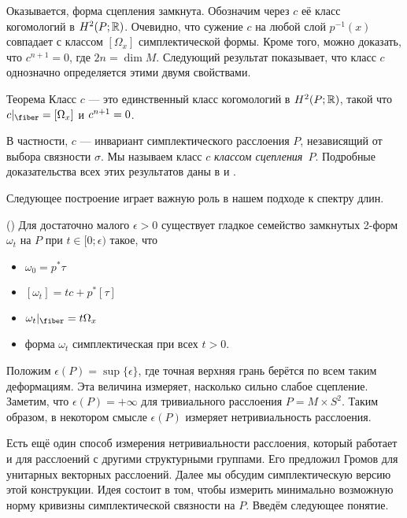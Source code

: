 Оказывается, форма сцепления замкнута.
Обозначим через $c$ её класс когомологий в $H^2 (P;\mathbb{R})$.
Очевидно, что сужение $c$ на любой слой $p^{-1}(x)$ совпадает с классом $[\Omega_x]$
симплектической формы.  
Кроме того, можно доказать, что $c^{n+1} = 0$, где $2n = \dim M$.
Следующий результат показывает, что класс $c$ однозначно определяется
этими двумя свойствами. 

\begin{thm}{Теорема}\label{9.3.A}
  Класс $c$ — это единственный класс когомологий в $H^2 (P;\mathbb{R})$,
  такой что $c|_{\fiber} = [\Omega_x]$ и $c^{n+1} \z= 0$.
\end{thm}

В частности, $c$ — инвариант симплектического расслоения $P$, независящий от выбора связности $\sigma$. 
Мы называем класс $c$ \emph{классом сцепления}~$P$.
Подробные доказательства всех этих результатов даны в \cite{GLS} и \cite{MS}.

Следующее построение играет важную роль в нашем подходе к спектру длин.

(\cite{GLS,MS})
Для достаточно малого $\epsilon > 0$ существует гладкое семейство
замкнутых 2-форм $\omega_t$ на $P$ при $t \in [0;\epsilon)$ такое, что 
\begin{itemize}
\item $\omega_0 = p^\ast \tau$
\item $[\omega_t] = tc + p^\ast [\tau]$
\item $\omega_t|_{\fiber} = t\Omega_x$
\item форма $\omega_t$ симплектическая при всех $t > 0$.
\end{itemize}

Положим $\epsilon(P) = \sup \{\epsilon\}$,
где точная верхняя грань берётся по всем таким деформациям.  
Эта величина измеряет, насколько сильно слабое сцепление.
Заметим, что $\epsilon(P) = +\infty$ для тривиального расслоения $P = M \times S^2$.
Таким образом, в некотором смысле $\epsilon(P)$ измеряет нетривиальность расслоения.

Есть ещё один способ измерения нетривиальности расслоения, который
работает и для расслоений с другими структурными группами. 
Его предложил Громов \cite{G2} для унитарных векторных расслоений.
Далее мы обсудим симплектическую версию этой конструкции. 
Идея состоит в том, чтобы измерить минимально возможную норму кривизны
симплектической связности на $P$. 
Введём следующее понятие.

